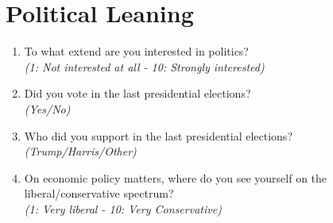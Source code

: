 \documentclass[11pt]{article}
\begin{document}
\section*{Political Leaning}
\begin{enumerate}[resume]
    \item To what extend are you interested in politics?\\ \textit{(1: Not interested at all - 10: Strongly interested)}
    \item Did you vote in the last presidential elections? \\\textit{(Yes/No)}
    \item Who did you support in the last presidential elections? \\ \textit{(Trump/Harris/Other)}
    \item On economic policy matters, where do you see yourself on the liberal/conservative spectrum? \\\textit{(1: Very liberal - 10: Very Conservative)}
        

\end{enumerate}
\end{document}
